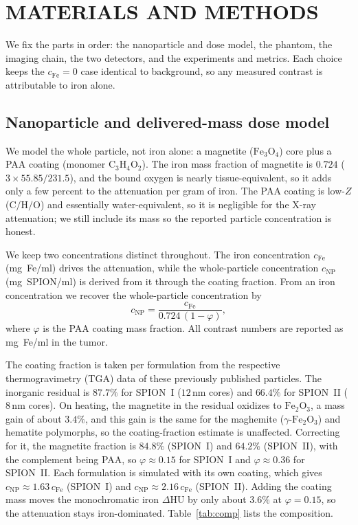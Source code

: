 \documentclass[]{spie}  %
\begin{document}
\section{MATERIALS AND METHODS}
\label{sec:methods}

We fix the parts in order: the nanoparticle and dose model, the phantom, the
imaging chain, the two detectors, and the experiments and metrics.
Each choice keeps the $c_{\mathrm{Fe}}=0$ case identical to background, so any
measured contrast is attributable to iron alone.

\subsection{Nanoparticle and delivered-mass dose model}
\label{sec:dose}
We model the whole particle, not iron alone: a magnetite ($\mathrm{Fe_3O_4}$) core
plus a PAA coating (monomer $\mathrm{C_3H_4O_2}$). The iron mass fraction of
magnetite is $0.724$ ($3\times55.85/231.5$), and the bound oxygen is nearly
tissue-equivalent, so it adds only a few percent to the attenuation per gram of iron.
The PAA coating is low-$Z$ ($\mathrm{C/H/O}$) and essentially water-equivalent, so
it is negligible for the X-ray attenuation; we still include its mass so the
reported particle concentration is honest.

We keep two concentrations distinct throughout. The iron concentration
$c_{\mathrm{Fe}}$ (mg~Fe/ml) drives the attenuation, while the whole-particle
concentration $c_{\mathrm{NP}}$ (mg~SPION/ml) is derived from it through the coating
fraction. From an iron concentration we recover the whole-particle concentration by
\begin{equation}
c_{\mathrm{NP}} = \frac{c_{\mathrm{Fe}}}{0.724\,(1-\varphi)},
\label{eq:cnp}
\end{equation}
where $\varphi$ is the PAA coating mass fraction. All contrast numbers are reported
as mg~Fe/ml in the tumor.

The coating fraction is taken per formulation from the respective thermogravimetry
(TGA) data of these previously published particles\cite{Heinen2026}. The inorganic residual is $87.7\%$ for
SPION~I ($12\,\mathrm{nm}$ cores) and $66.4\%$ for SPION~II ($8\,\mathrm{nm}$ cores).
On heating, the magnetite in the residual oxidizes to $\mathrm{Fe_2O_3}$, a mass gain
of about $3.4\%$, and this gain is the same for the maghemite ($\gamma$-$\mathrm{Fe_2O_3}$)
and hematite polymorphs, so the coating-fraction estimate is unaffected. Correcting for
it, the magnetite fraction is $84.8\%$ (SPION~I) and $64.2\%$ (SPION~II), with the
complement being PAA, so $\varphi\approx0.15$ for SPION~I and $\varphi\approx0.36$ for
SPION~II. Each formulation is simulated with its own coating, which gives
$c_{\mathrm{NP}}\approx1.63\,c_{\mathrm{Fe}}$ (SPION~I) and
$c_{\mathrm{NP}}\approx2.16\,c_{\mathrm{Fe}}$ (SPION~II). Adding the coating mass
moves the monochromatic iron $\Delta$HU by only about $3.6\%$ at $\varphi=0.15$, so
the attenuation stays iron-dominated. Table~\ref{tab:comp} lists the composition.
\end{document}
